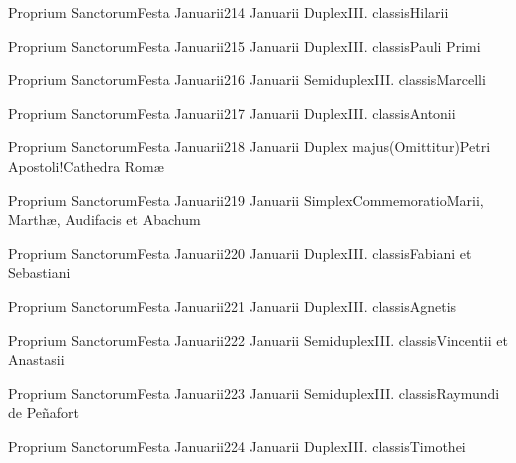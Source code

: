\documentclass[invitatoriale-romanum.tex]{subfiles}
\begin{document}


	{Proprium Sanctorum}{Festa Januarii}{2}{14 Januarii}
	{Duplex}{III. classis}{Hilarii}
	{}
	{}
	
	{Proprium Sanctorum}{Festa Januarii}{2}{15 Januarii}
	{Duplex}{III. classis}{Pauli Primi}
	{}
	{}

	{Proprium Sanctorum}{Festa Januarii}{2}{16 Januarii}
	{Semiduplex}{III. classis}{Marcelli}
	{}
	{}
	
	{Proprium Sanctorum}{Festa Januarii}{2}{17 Januarii}
	{Duplex}{III. classis}{Antonii}
	{}
	{}

\pagebreak

	{Proprium Sanctorum}{Festa Januarii}{2}{18 Januarii}
	{Duplex majus}{(Omittitur)}{Petri Apostoli!Cathedra Romæ}
	{}
	{\invitferia}

	{Proprium Sanctorum}{Festa Januarii}{2}{19 Januarii}
	{Simplex}{Commemoratio}{Marii, Marthæ, Audifacis et Abachum}
	{}
	{\invitferia}

	{Proprium Sanctorum}{Festa Januarii}{2}{20 Januarii}
	{Duplex}{III. classis}{Fabiani et Sebastiani}
	{}
	{}

	{Proprium Sanctorum}{Festa Januarii}{2}{21 Januarii}
	{Duplex}{III. classis}{Agnetis}
	{}
	{}

	{Proprium Sanctorum}{Festa Januarii}{2}{22 Januarii}
	{Semiduplex}{III. classis}{Vincentii et Anastasii}
	{}
	{}

	{Proprium Sanctorum}{Festa Januarii}{2}{23 Januarii}
	{Semiduplex}{III. classis}{Raymundi de Peñafort}
	{}
	{}

	{Proprium Sanctorum}{Festa Januarii}{2}{24 Januarii}
	{Duplex}{III. classis}{Timothei}
	{}
	{}
\end{document}
